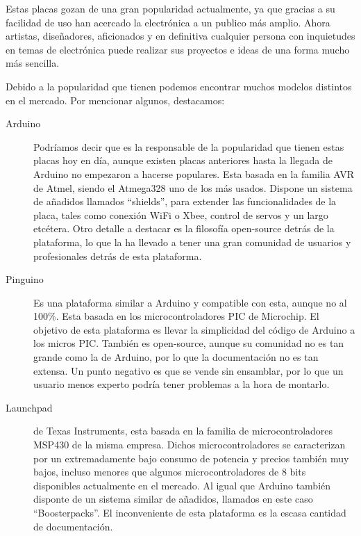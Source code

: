 Estas placas gozan de una gran popularidad actualmente, ya que gracias a su facilidad de uso han acercado la electrónica a un publico más amplio. Ahora artistas, diseñadores, aficionados y en definitiva cualquier persona con inquietudes en temas de electrónica puede realizar sus proyectos e ideas de una forma mucho más sencilla.



Debido a la popularidad que tienen podemos encontrar muchos modelos distintos en el mercado. Por mencionar algunos, destacamos: 
\begin{description}
\item[Arduino] Podríamos decir que es la responsable de la popularidad que tienen estas placas hoy en día, aunque existen placas anteriores hasta la llegada de Arduino no empezaron a hacerse populares. Esta basada en la familia AVR de Atmel, siendo el Atmega328 uno de los más usados. Dispone un sistema de añadidos llamados “shields”, para extender las funcionalidades de la placa, tales como conexión WiFi o Xbee, control de servos y un largo etcétera. Otro detalle a destacar es la filosofía open-source detrás de la plataforma, lo que la ha llevado a tener una gran comunidad de usuarios y profesionales detrás de esta plataforma.
\item[Pinguino] Es una plataforma similar a Arduino y compatible con esta, aunque no al 100\%. Esta basada en los microcontroladores PIC de Microchip. El objetivo de esta plataforma es llevar la simplicidad del código de Arduino a los micros PIC. También es open-source, aunque su comunidad no es tan grande como la de Arduino, por lo que la documentación no es tan extensa. Un punto negativo es que se vende sin ensamblar, por lo que un usuario menos experto podría tener problemas a la hora de montarlo.
\item[Launchpad] de Texas Instruments, esta basada en la familia de microcontroladores MSP430 de la misma empresa. Dichos microcontroladores se caracterizan por un extremadamente bajo consumo de potencia y precios también muy bajos, incluso menores que algunos microcontroladores de 8 bits disponibles actualmente en el mercado. Al igual que Arduino también disponte de un sistema similar de añadidos, llamados en este caso “Boosterpacks”. El inconveniente de esta plataforma es la escasa cantidad de documentación.
\end{description}


